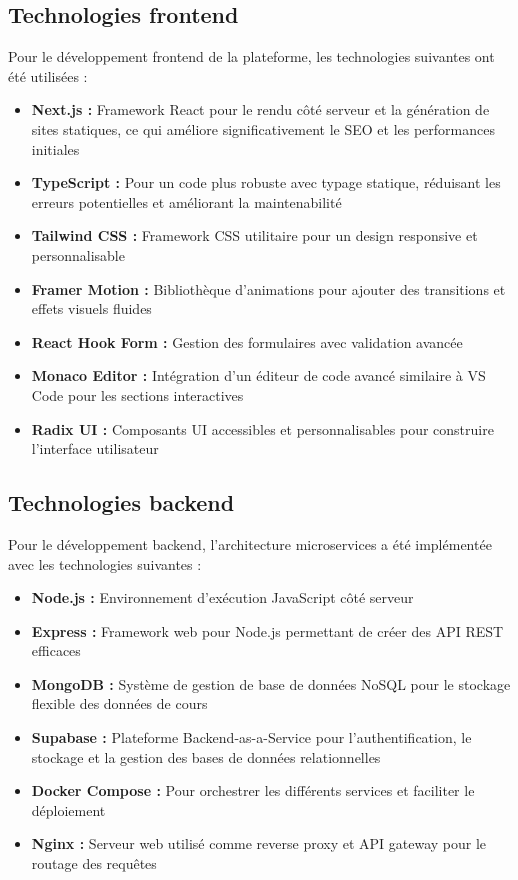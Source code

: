 \subsection{Technologies frontend}
Pour le développement frontend de la plateforme, les technologies suivantes ont été utilisées :
\begin{itemize}
  \item \textbf{Next.js :} Framework React pour le rendu côté serveur et la génération de sites statiques, ce qui améliore significativement le SEO et les performances initiales
  \item \textbf{TypeScript :} Pour un code plus robuste avec typage statique, réduisant les erreurs potentielles et améliorant la maintenabilité
  \item \textbf{Tailwind CSS :} Framework CSS utilitaire pour un design responsive et personnalisable
  \item \textbf{Framer Motion :} Bibliothèque d'animations pour ajouter des transitions et effets visuels fluides
  \item \textbf{React Hook Form :} Gestion des formulaires avec validation avancée
  \item \textbf{Monaco Editor :} Intégration d'un éditeur de code avancé similaire à VS Code pour les sections interactives
  \item \textbf{Radix UI :} Composants UI accessibles et personnalisables pour construire l'interface utilisateur
\end{itemize}

\subsection{Technologies backend}
Pour le développement backend, l'architecture microservices a été implémentée avec les technologies suivantes :
\begin{itemize}
  \item \textbf{Node.js :} Environnement d'exécution JavaScript côté serveur
  \item \textbf{Express :} Framework web pour Node.js permettant de créer des API REST efficaces
  \item \textbf{MongoDB :} Système de gestion de base de données NoSQL pour le stockage flexible des données de cours
  \item \textbf{Supabase :} Plateforme Backend-as-a-Service pour l'authentification, le stockage et la gestion des bases de données relationnelles
  \item \textbf{Docker Compose :} Pour orchestrer les différents services et faciliter le déploiement
  \item \textbf{Nginx :} Serveur web utilisé comme reverse proxy et API gateway pour le routage des requêtes
\end{itemize}


